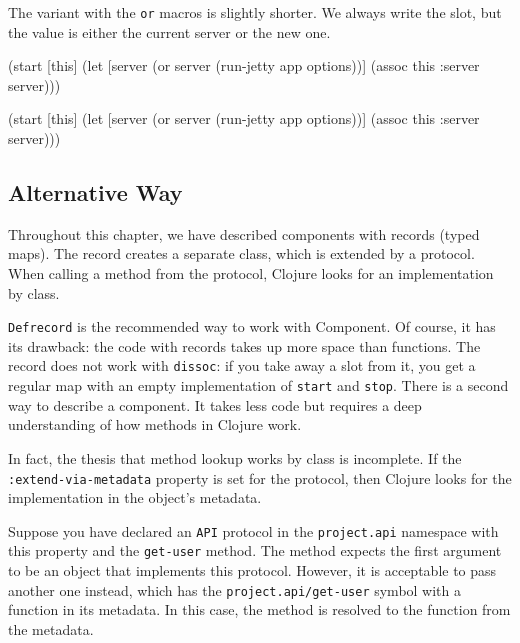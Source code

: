 The variant with the \verb|or| macros is slightly shorter. We always write the slot, but the value is either the current server or the new one.

\ifnarrow

\begin{english}
  \begin{clojure}
(start [this]
  (let [server (or server
                   (run-jetty
                     app options))]
    (assoc this :server server)))
  \end{clojure}
\end{english}

\else

\begin{english}
  \begin{clojure}
(start [this]
  (let [server (or server
                   (run-jetty app options))]
    (assoc this :server server)))
  \end{clojure}
\end{english}

\fi

\subsection{Alternative Way}

Throughout this chapter, we have described components with records (typed maps). The record creates a separate class, which is extended by a protocol. When calling a method from the protocol, Clojure looks for an implementation by class.


\verb|Defrecord| is the recommended way to work with Component. Of course, it has its drawback: the code with records takes up more space than functions. The record does not work with \verb|dissoc|: if you take away a slot from it, you get a regular map with an empty implementation of \verb|start| and \verb|stop|. There is a second way to describe a component. It takes less code but requires a deep understanding of how methods in Clojure work.

In fact, the thesis that method lookup works by class is incomplete. If the \verb|:extend-via-metadata| property is set for the protocol, then Clojure looks for the implementation in the object's metadata.

Suppose you have declared an \verb|API| protocol in the \verb|project.api| namespace with this property and the \verb|get-user| method. The method expects the first argument to be an object that implements this protocol. However, it is acceptable to pass another one instead, which has the \verb|project.api/get-user| symbol with a function in its metadata. In this case, the method is resolved to the function from the metadata.

